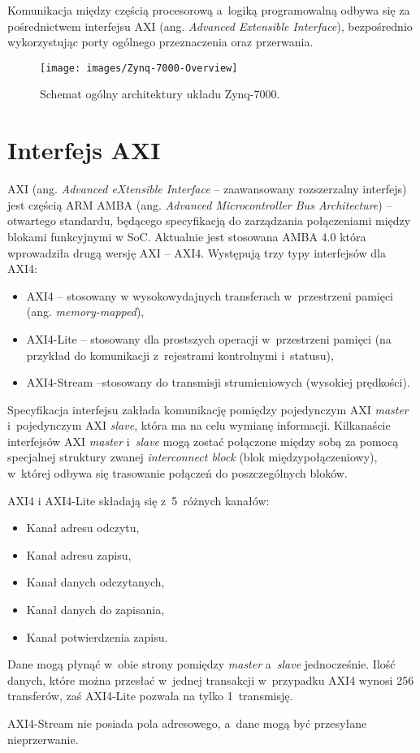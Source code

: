 Komunikacja między częścią procesorową a~logiką programowalną odbywa się za pośrednictwem interfejsu AXI (ang. \textit{Advanced Extensible Interface}), bezpośrednio wykorzystując porty ogólnego przeznaczenia oraz przerwania.

\begin{figure}[h]
\centering
\texttt{[image: images/Zynq-7000-Overview]}
\caption{Schemat ogólny architektury układu Zynq-7000.}
\label{fig:zynq7000}
\end{figure}

\section{Interfejs AXI}

AXI (ang. \textit{Advanced eXtensible Interface} -- zaawansowany rozszerzalny interfejs) jest częścią ARM AMBA (ang.\textit{ Advanced Microcontroller Bus Architecture}) -- otwartego standardu, będącego specyfikacją do zarządzania połączeniami między blokami funkcyjnymi w SoC.
Aktualnie jest stosowana AMBA 4.0 która wprowadziła drugą wersję AXI -- AXI4.
Występują trzy typy interfejsów dla AXI4:
\begin{itemize}
\item AXI4 -- stosowany w wysokowydajnych transferach w~przestrzeni pamięci (ang. \textit{memory-mapped}),
\item AXI4-Lite -- stosowany dla prostszych operacji w~przestrzeni pamięci (na przykład do komunikacji z~rejestrami kontrolnymi i~statusu),
\item AXI4-Stream --stosowany do transmisji strumieniowych (wysokiej prędkości).
\end{itemize}
Specyfikacja interfejsu zakłada komunikację pomiędzy pojedynczym AXI \textit{master} i~pojedynczym AXI \textit{slave}, która ma na celu wymianę informacji.
Kilkanaście interfejsów AXI \textit{master} i~\textit{slave} mogą zostać połączone między sobą za pomocą specjalnej struktury zwanej \textit{interconnect block} (blok międzypołączeniowy), w~której odbywa się trasowanie połączeń do poszczególnych bloków.

AXI4 i AXI4-Lite składają się z~5~różnych kanałów:
\begin{itemize}
\item Kanał adresu odczytu,
\item Kanał adresu zapisu,
\item Kanał danych odczytanych,
\item Kanał danych do zapisania,
\item Kanał potwierdzenia zapisu.
\end{itemize}

Dane mogą płynąć w~obie strony pomiędzy \textit{master} a~\textit{slave} jednocześnie.
Ilość danych, które można przesłać w~jednej transakcji w~przypadku AXI4 wynosi 256 transferów, zaś AXI4-Lite pozwala na tylko 1~transmisję.

AXI4-Stream nie posiada pola adresowego, a~dane mogą być przesyłane nieprzerwanie.